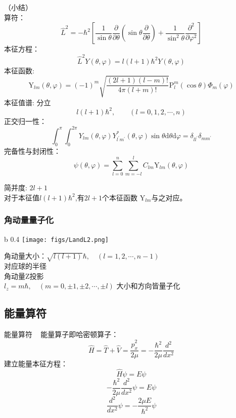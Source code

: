 \begin{frame} [allowframebreaks=]
    （小结）\\ \vspace{0.3em}
    算符：  $$ \hat{L}^{2}=-\hbar^{2}\left[\frac{1}{\sin \theta} \frac{\partial}{\partial \theta}\left(\sin \theta \frac{\partial}{\partial \theta}\right)+\frac{1}{\sin ^{2} \theta} \frac{\partial^{2}}{\partial \varphi^{2}}\right] $$
    本征方程： $$\hat{L}^2Y(\theta,\varphi)=l(l+1)\hbar^2 Y(\theta,\varphi)$$
    本征函数:     $$
    \mathrm{Y}_{l m}(\theta, \varphi)=(-1)^{m} \sqrt{\frac{(2 l+1)(l-m) !}{4 \pi(l+m) !}} \mathrm{P}_{l}^{m}(\cos \theta) \Phi_{m}(\varphi)
    $$ 
    本征值谱:  分立
    $$l(l+1)\hbar^2, \qquad (l= 0,1,2,\cdots, n) $$
    正交归一性：
    $$
    \int_{0}^{\pi} \int_{0}^{2 \pi} Y_{l m}(\theta, \varphi) Y_{l^{\prime} m^{\prime}}^{*}(\theta, \varphi) \sin \theta \mathrm{d} \theta \mathrm{d} \varphi=\delta_{l l^{\prime}} \delta_{m m^{\prime}}
    $$
    完备性与封闭性：
    $$\psi(\theta, \varphi)=\sum_{l=0}^{n} \sum_{m=-l}^{l} C_{l m} \mathrm{Y}_{l m}(\theta, \varphi)$$

    简并度: $2l+1$\\
    对于本征值$l(l+1)\hbar^2$,有$2l+1$个本征函数 $\mathrm{Y}_{l m}$与之对应。
\end{frame} 

\begin{frame} 
    \frametitle{角动量量子化}
    \begin{wrapfigure} {b} {0.4\textwidth} %
        \texttt{[image: figs/LandL2.png]}   
    \end{wrapfigure}
    {\Bullet} 角动量大小：$\sqrt{l(l+1)}\hbar, \quad (l=1,2,\cdots, n-1)$\\
    对应球的半径\\ \vspace{0.3em}
    {\Bullet} 角动量Z投影 \\
    $l_z=m\hbar, \quad (m=0,\pm 1,\pm 2, \cdots, \pm l)$
    {\Bullet} 大小和方向皆量子化
\end{frame} 

\subsection{能量算符}

\begin{frame} {能量算符}
    \解~ 能量算子即哈密顿算子：
    $$ \hat{H}=\hat{T}+\hat{V}=\frac{\hat{p}_x ^2 }{2\mu} = -\frac{\hbar^2}{2\mu}\frac{d^2}{dx^2} $$
    建立能量本征方程：
    $$ \hat{H} \psi =E \psi $$
    $$ -\frac{\hbar^2}{2\mu}\frac{d^2}{dx^2} \psi =E \psi $$
    $$ \frac{d^2}{dx^2} \psi = -\frac{2\mu E}{\hbar^2} \psi $$
\end{frame}

